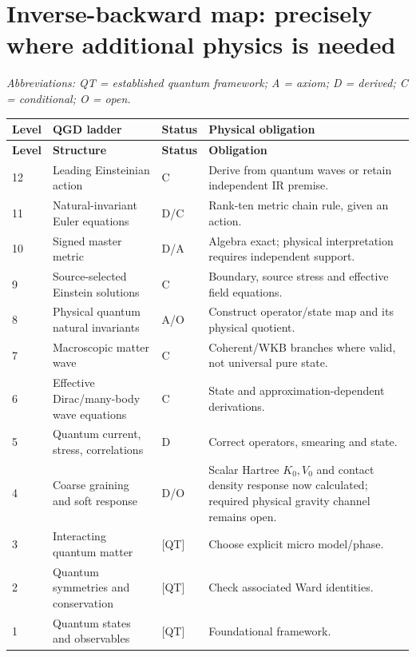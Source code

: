 \documentclass[11pt,a4paper]{article}
\theoremstyle{remark}\newtheorem{remark}[theorem]{Remark}
\begin{document}
\section{Inverse-backward map: precisely where additional physics is needed}
\small
\noindent\textit{Abbreviations: QT = established quantum framework; A = axiom; D = derived; C = conditional; O = open.}\par\medskip
\begin{longtable}{@{}p{9mm}p{43mm}p{18mm}p{73mm}@{}}\toprule
\textbf{Level}&\textbf{QGD ladder}&\textbf{Status}&\textbf{Physical obligation}\\\midrule\endfirsthead
\toprule\textbf{Level}&\textbf{Structure}&\textbf{Status}&\textbf{Obligation}\\\midrule\endhead
12&Leading Einsteinian action&\textsf{C}&Derive from quantum waves or retain independent IR premise.\\
11&Natural-invariant Euler equations&\textsf{D/C}&Rank-ten metric chain rule, given an action.\\
10&Signed master metric&\textsf{D/A}&Algebra exact; physical interpretation requires independent support.\\
9&Source-selected Einstein solutions&\textsf{C}&Boundary, source stress and effective field equations.\\
8&Physical quantum natural invariants&\textsf{A/O}&Construct operator/state map and its physical quotient.\\
7&Macroscopic matter wave&\textsf{C}&Coherent/WKB branches where valid, not universal pure state.\\
6&Effective Dirac/many-body wave equations&\textsf{C}&State and approximation-dependent derivations.\\
5&Quantum current, stress, correlations&\textsf{D}&Correct operators, smearing and state.\\
4&Coarse graining and soft response&\textsf{D/O}&Scalar Hartree $K_0,V_0$ and contact density response now calculated; required physical gravity channel remains open.\\
3&Interacting quantum matter&\textsf{[QT]}&Choose explicit micro model/phase.\\
2&Quantum symmetries and conservation&\textsf{[QT]}&Check associated Ward identities.\\
1&Quantum states and observables&\textsf{[QT]}&Foundational framework.\\\bottomrule
\end{longtable}\normalsize
\end{document}
